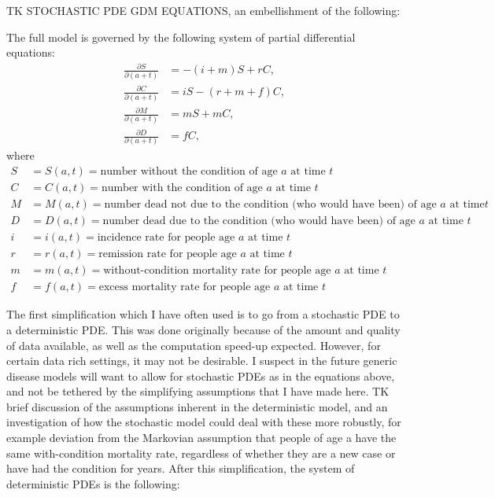 TK STOCHASTIC PDE GDM EQUATIONS, an embellishment of the following:

The full model is governed by the following system of partial
differential equations:
\begin{align*}
\frac{\partial S}{\partial (a+t)} &= -(i + m)S + rC,\\
\frac{\partial C}{\partial (a+t)} &= iS - (r + m + f)C,\\
\frac{\partial M}{\partial (a+t)} &= mS + mC,\\
\frac{\partial D}{\partial (a+t)} &= fC,
\end{align*}
where
\begin{align*}
S &= S(a,t) = \text{number without the condition of age $a$ at time $t$}\\
C &= C(a,t) = \text{number with the condition of age $a$ at
  time $t$}\\
M &= M(a,t) = \text{number dead not due to the condition (who would have been) of age $a$ at time
$t$}\\
D &= D(a,t) = \text{number dead due to the condition
  (who would have been) of age $a$ at time $t$}\\[.1in]
i &= i(a,t) = \text{incidence rate for people age $a$ at time $t$}\\
r &= r(a,t) = \text{remission rate for people age $a$ at time $t$}\\
m &= m(a,t) = \text{without-condition mortality rate for people age $a$ at
time $t$}\\
f &= f(a,t) = \text{excess mortality rate for people age $a$ at time
  $t$}
\end{align*}

The first simplification which I have often used is to go from a
stochastic PDE to a deterministic PDE. This was done originally
because of the amount and quality of data available, as well as the
computation speed-up expected.  However, for certain data rich
settings, it may not be desirable. I suspect in the future generic
disease models will want to allow for stochastic PDEs as in the
equations above, and not be tethered by the simplifying assumptions
that I have made here. TK brief discussion of the assumptions inherent
in the deterministic model, and an investigation of how the stochastic
model could deal with these more robustly, for example deviation from
the Markovian assumption that people of age a have the same
with-condition mortality rate, regardless of whether they are a new
case or have had the condition for years. After this simplification,
the system of deterministic PDEs is the following:

